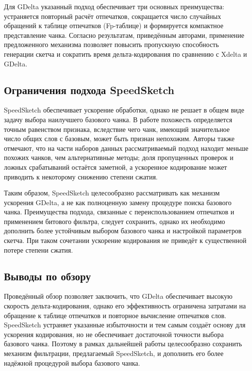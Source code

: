 \documentclass[a4paper]{article}
\begin{document}
Для GDelta указанный подход обеспечивает три основных преимущества: устраняется повторный расчёт отпечатков, сокращается число случайных обращений к таблице отпечатков (Fp-таблице) и формируется компактное представление чанка. Согласно результатам, приведённым авторами, применение предложенного механизма позволяет повысить пропускную способность генерации скетча и сократить время дельта-кодирования по сравнению с Xdelta и GDelta.

\subsection{Ограничения подхода SpeedSketch}

SpeedSketch обеспечивает ускорение обработки, однако не решает в общем виде задачу выбора наилучшего базового чанка. В работе похожесть определяется точным равенством признака, вследствие чего чанк, имеющий значительное число общих слов с базовым, может быть признан непохожим. Авторы также отмечают, что на части наборов данных рассматриваемый подход находит меньше похожих чанков, чем альтернативные методы; доля пропущенных проверок и ложных срабатываний остаётся заметной, а ускоренное кодирование может приводить к некоторому снижению степени сжатия.

Таким образом, SpeedSketch целесообразно рассматривать как механизм ускорения GDelta, а не как полноценную замену процедуре поиска базового чанка. Преимущества подхода, связанные с переиспользованием отпечатков и применением битового фильтра, следует сохранить, однако их необходимо дополнить более устойчивым выбором базового чанка и настройкой параметров скетча. При таком сочетании ускорение кодирования не приведёт к существенной потере степени сжатия.

\subsection{Выводы по обзору}

Проведённый обзор позволяет заключить, что GDelta обеспечивает высокую скорость дельта-кодирования, однако его эффективность ограничена затратами на обращение к таблице отпечатков и повторное вычисление отпечатков слов. SpeedSketch устраняет указанные избыточности и тем самым создаёт основу для ускорения кодирования, но не обеспечивает достаточной точности выбора базового чанка. Поэтому в рамках дальнейшей работы целесообразно сохранить механизм фильтрации, предлагаемый SpeedSketch, и дополнить его более надёжной процедурой выбора базового чанка.
\end{document}
